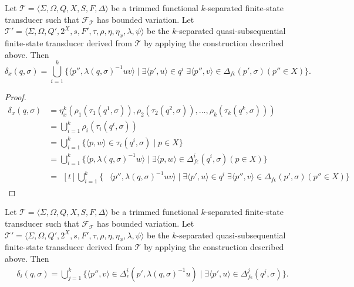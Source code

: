 \begin{proposition}
  Let $\mathcal{T} = \langle \Sigma, \Omega, Q, X, S, F, \Delta \rangle$ be a trimmed
  functional $k$-separated finite-state transducer such that
  $\mathcal{F}_\mathcal{T}$ has bounded variation.
  Let $\mathcal{T}' = \langle \Sigma, \Omega, Q', 2^X, s, F', \tau, \rho, \eta,
  \eta_x, \lambda, \psi \rangle$ be the $k$-separated quasi-subsequential
  finite-state transducer derived from $\mathcal{T}$ by applying the construction
  described above. Then
  \begin{equation*}
    \delta_x(q, \sigma) = \bigcup_{i=1}^k \{ \langle p'', \lambda(q, \sigma)^{-1}uv
    \rangle \mid \exists \langle p', u \rangle \in q^i \; \exists \langle p'', v
    \rangle \in \Delta_{f\epsilon}(p', \sigma) (p'' \in X) \}.
  \end{equation*}
\end{proposition}

\begin{proof}
  \begin{align*}
    \delta_x(q, \sigma)
    &= \eta_x^k(\rho_1(\tau_1(q^1, \sigma)), \rho_2(\tau_2(q^2, \sigma)), \ldots,
    \rho_k(\tau_k(q^k, \sigma)))\\
    &= \bigcup_{i=1}^k \rho_i(\tau_i(q^i, \sigma))\\
    &= \bigcup_{i=1}^k \{ \langle p, w \rangle \in \tau_i(q^i, \sigma) \mid p \in X
    \}\\
    &= \bigcup_{i=1}^k \{ \langle p, \lambda(q, \sigma)^{-1}w \rangle \mid \exists
    \langle p, w \rangle \in \Delta_{f\epsilon}^i(q^i, \sigma) (p \in X) \}\\
    &= \begin{aligned}[t]
      \bigcup_{i=1}^k \{ &\langle p'', \lambda(q, \sigma)^{-1}uv \rangle \mid
      \exists \langle p', u \rangle \in q^i \; \exists \langle p'', v \rangle \in
      \Delta_{f\epsilon}(p', \sigma) (p'' \in X) \}
    \end{aligned}
  \end{align*}
\end{proof}

\begin{proposition}
  Let $\mathcal{T} = \langle \Sigma, \Omega, Q, X, S, F, \Delta \rangle$ be a trimmed
  functional $k$-separated finite-state transducer such that
  $\mathcal{F}_\mathcal{T}$ has bounded variation.
  Let $\mathcal{T}' = \langle \Sigma, \Omega, Q', 2^X, s, F', \tau, \rho, \eta,
  \eta_x, \lambda, \psi \rangle$ be the $k$-separated quasi-subsequential
  finite-state transducer derived from $\mathcal{T}$ by applying the construction
  described above. Then
  \begin{align*}
    \delta_i(q, \sigma) = \bigcup_{j=1}^k \{ \langle p'', v \rangle \in
    \Delta_\epsilon^i(p', \lambda(q, \sigma)^{-1}u) \mid \exists \langle p', u
    \rangle \in \Delta_{f\epsilon}^j(q^j, \sigma) \}.
  \end{align*}
\end{proposition}

